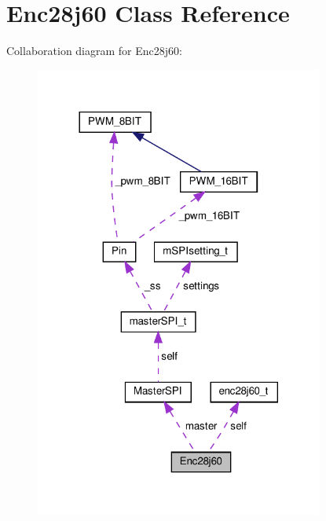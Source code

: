 \hypertarget{classEnc28j60}{}\section{Enc28j60 Class Reference}
\label{classEnc28j60}


Collaboration diagram for Enc28j60\+:\nopagebreak
\begin{figure}[H]
\begin{center}
\leavevmode
\includegraphics[width=269pt]{classEnc28j60__coll__graph}
\end{center}
\end{figure}
